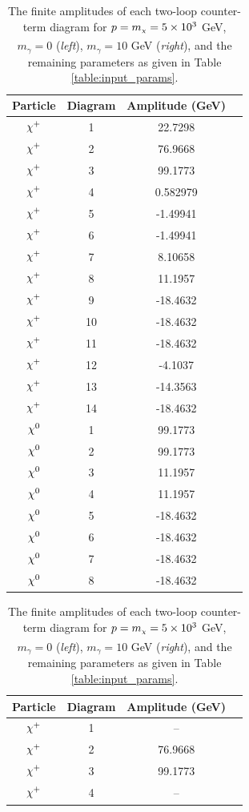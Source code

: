 \documentclass[11pt]{article}
\newcommand{\mychi}{\raisebox{0pt}[1ex][1ex]{\tiny$\chi$}}
\newcommand{\mychibig}{\raisebox{0pt}[1ex][1ex]{$\chi$}}
\def\mc{m_{\mychi}}
\begin{document}
\begin{table}[h!]
\caption{The finite amplitudes of each two-loop counter-term diagram for $p=\mc=5\times10^3$ GeV, $m_{\gamma}=0$ (\textit{left}), $m_{\gamma}=10$ GeV (\textit{right}), and the remaining parameters as given in Table \ref{table:input_params}.}\label{table:diagram_amp_2_d}
\centering
\vspace{0.2cm}
\begin{tabular}{c c c c}
Particle & Diagram & Amplitude (GeV) \\
\hline
$\mychibig^+$ & 1 & 22.7298 \\ 
$\mychibig^+$ & 2 & 76.9668 \\ 
$\mychibig^+$ & 3 & 99.1773 \\ 
$\mychibig^+$ & 4 & 0.582979 \\ 
$\mychibig^+$ & 5 & -1.49941 \\ 
$\mychibig^+$ & 6 & -1.49941 \\ 
$\mychibig^+$ & 7 & 8.10658 \\ 
$\mychibig^+$ & 8 & 11.1957 \\ 
$\mychibig^+$ & 9 & -18.4632 \\ 
$\mychibig^+$ & 10 & -18.4632 \\ 
$\mychibig^+$ & 11 & -18.4632 \\ 
$\mychibig^+$ & 12 & -4.1037 \\ 
$\mychibig^+$ & 13 & -14.3563 \\ 
$\mychibig^+$ & 14 & -18.4632 \\ 
$\mychibig^0$ & 1 & 99.1773 \\ 
$\mychibig^0$ & 2 & 99.1773 \\ 
$\mychibig^0$ & 3 & 11.1957 \\ 
$\mychibig^0$ & 4 & 11.1957 \\ 
$\mychibig^0$ & 5 & -18.4632 \\ 
$\mychibig^0$ & 6 & -18.4632 \\ 
$\mychibig^0$ & 7 & -18.4632 \\ 
$\mychibig^0$ & 8 & -18.4632 \\ 
\hline\end{tabular}
\begin{tabular}{c c c c}
Particle & Diagram & Amplitude (GeV) \\
\hline
$\mychibig^+$ & 1 & -- \\ 
$\mychibig^+$ & 2 & 76.9668 \\ 
$\mychibig^+$ & 3 & 99.1773 \\ 
$\mychibig^+$ & 4 & -- \\ 

\end{tabular}
\end{table}
\end{document}
